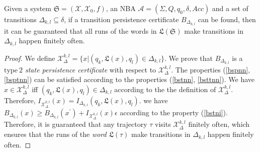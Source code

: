 \documentclass[acmlarge]{acmart}
\begin{document}
\begin{theorem}
  \label{transition-persistence-lemma1}
  Given a system $\mathfrak{S}=(\mathcal{X}, \mathcal{X}_0, f)$, an NBA $\mathcal{A} = (\Sigma, Q, q_0, \delta, Acc)$ and a set of transitions $\Delta_{k, l} \subseteq \delta$, if a transition persistence certificate \(B_{\Delta_{k, l}}\) can be found, then it can be guaranteed that all runs of the words in $\mathfrak{L}(\mathfrak{S})$ make transitions in $\Delta_{k,l}$ happen finitely often.
\end{theorem}

\begin{proof}
We define \(\mathcal{X}_{\Delta}^{k, l}=\{x | (q_k, \mathfrak{L}(x), q_l) \in \Delta_{k,l}\} \). We prove that \(B_{\Delta_{k, l}}\) is a \emph{$\mathrm{type~2}$ state persistence certificate} with respect to \(\mathcal{X}_{\Delta}^{k, l}\). The properties (\ref{bspnn}, \ref{bsptnn}) can be satisfied according to the properties (\ref{bstnn}, \ref{bsttnn}).
We have \(x \in \mathcal{X}_{\Delta}^{k, l}\)  iff  \((q_k, \mathfrak{L}(x), q_l) \in \Delta_{k, l}\) according to the the definition of $\mathcal{X}_{\Delta}^{k, l}$. Therefore, \(I_{\mathcal{X}_{\Delta}^{k, l}}(x) = I_{\Delta_{k,l}}(q_k, \mathfrak{L}(x), q_l)\). we have \(B_{\Delta_{k, l}}(x) \geq B_{\Delta_{k, l}}(x^{\prime}) + I_{\mathcal{X}_{\Delta}^{k, l}}(x)\epsilon\) according to the property (\ref{bstni}).
Therefore, it is guaranteed that any trajectory \(\tau\) visits \(\mathcal{X}_{\Delta}^{k, l}\) finitely often, which ensures that the runs of the \emph{word} \(\mathfrak{L}(\tau)\) make transitions in \(\Delta_{k, l}\) happen finitely often.
\end{proof}
\end{document}
